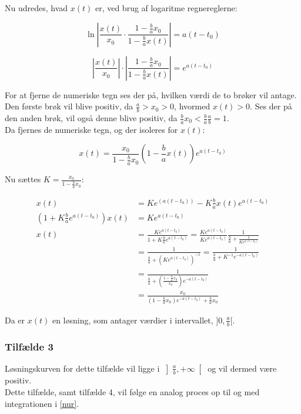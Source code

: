 Nu udredes, hvad $x(t)$ er, ved brug af logaritme regnereglerne:

\begin{equation*}
    \ln \left| \frac{x(t)}{x_0} \cdot \frac{1-\frac{b}{a}x_0}{1-\frac{b}{a}x(t)} \right| = a(t-t_0)
\end{equation*}

\begin{equation}\label{nur}
    \left|\frac{x(t)}{x_0}\right| \cdot \left| \frac{1-\frac{b}{a}x_0}{1-\frac{b}{a}x(t)} \right| 
    = e^{a(t-t_0)}
\end{equation}

For at fjerne de numeriske tegn ses der på, hvilken værdi de to brøker vil antage. Den første brøk vil blive positiv, da $\frac{a}{b}>x_0>0$, hvormed $x(t)>0$. Ses der på den anden brøk, vil også denne blive positiv, da $\frac{b}{a}x_0<\frac{b}{a}\frac{a}{b}=1$. \\
\hfill 
Da fjernes de numeriske tegn, og der isoleres for $x(t)$:

$$x(t) = \frac{x_0}{1 - \frac{b}{a}x_0} \left(1- \frac{b}{a}x(t) \right)e^{a(t-t_0)}$$

Nu sættes $K = \frac{x_0}{1 - \frac{b}{a}x_0}$:

\begin{align*}
x(t) &= K e^{(a(t-t_0))}-K \frac{b}{a}x(t) e^{a(t-t_0)} \\
\left(1+K \frac{b}{a} e^{a(t-t_0)}\right)x(t) &=K e^{a(t-t_0)} \\
x(t) &=\frac{K e^{a(t-t_0)}}{1+K \frac{b}{a} e^{a(t-t_0)}} = \frac{K e^{a(t-t_0)}}{K e^{a(t-t_0)}}\frac{1}{\frac{b}{a}+\frac{1}{Ke^{a(t-t_0)}}} \\
&= \frac{1}{\frac{b}{a}+(Ke^{a(t-t_0)})^{-1}} = \frac{1}{\frac{b}{a}+K^{-1}e^{-a(t-t_0)}} \\
&=\frac{1}{\frac{b}{a}+ \left( \frac{1-\frac{b}{a}x_0}{x_0} \right)e^{-a(t-t_0)}} \\
&=\frac{x_0}{ \left(1-\frac{b}{a}x_0 \right)e^{-a(t-t_0)}+ \frac{b}{a}x_0 }
\end{align*}

Da er $x(t)$ en løsning, som antager værdier i intervallet, $]0, \frac{a}{b}[.$

\subsubsection{Tilfælde 3}
Løsningskurven for dette tilfælde vil ligge i $\left] \frac{a}{b}, +\infty \right[$ og vil dermed være positiv.\\
\hfill \break
Dette tilfælde, samt tilfælde 4, vil følge en analog proces op til og med integrationen i \eqref{nur}.\\
\hfill \break

